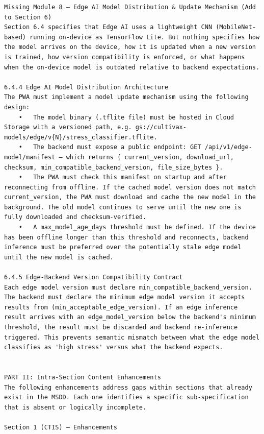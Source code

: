 \documentclass{article}
\begin{document}
\begin{verbatim}
Missing Module 8 — Edge AI Model Distribution & Update Mechanism (Add to Section 6)
Section 6.4 specifies that Edge AI uses a lightweight CNN (MobileNet-based) running on-device as TensorFlow Lite. But nothing specifies how the model arrives on the device, how it is updated when a new version is trained, how version compatibility is enforced, or what happens when the on-device model is outdated relative to backend expectations.

6.4.4 Edge AI Model Distribution Architecture
The PWA must implement a model update mechanism using the following design:
	•	The model binary (.tflite file) must be hosted in Cloud Storage with a versioned path, e.g. gs://cultivax-models/edge/v{N}/stress_classifier.tflite.
	•	The backend must expose a public endpoint: GET /api/v1/edge-model/manifest — which returns { current_version, download_url, checksum, min_compatible_backend_version, file_size_bytes }.
	•	The PWA must check this manifest on startup and after reconnecting from offline. If the cached model version does not match current_version, the PWA must download and cache the new model in the background. The old model continues to serve until the new one is fully downloaded and checksum-verified.
	•	A max_model_age_days threshold must be defined. If the device has been offline longer than this threshold and reconnects, backend inference must be preferred over the potentially stale edge model until the new model is cached.

6.4.5 Edge-Backend Version Compatibility Contract
Each edge model version must declare min_compatible_backend_version. The backend must declare the minimum edge model version it accepts results from (min_acceptable_edge_version). If an edge inference result arrives with an edge_model_version below the backend's minimum threshold, the result must be discarded and backend re-inference triggered. This prevents semantic mismatch between what the edge model classifies as 'high stress' versus what the backend expects.


PART II: Intra-Section Content Enhancements
The following enhancements address gaps within sections that already exist in the MSDD. Each one identifies a specific sub-specification that is absent or logically incomplete.

Section 1 (CTIS) — Enhancements


\end{verbatim}
\end{document}
